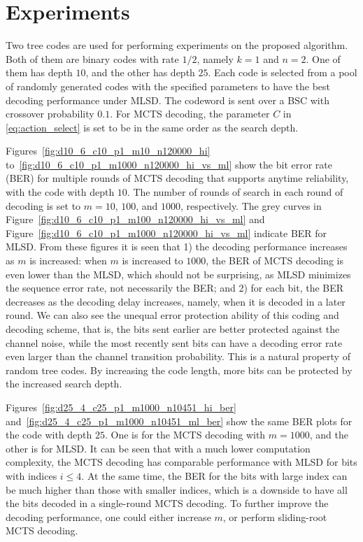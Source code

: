 \documentclass[conference,letterpaper]{IEEEtran}
\begin{document}
\section{Experiments}
Two tree codes are used for performing experiments on the proposed algorithm. Both of them are binary codes with rate $1/2$, namely $k=1$ and $n=2$. One of them has depth $10$, and the other has depth $25$. Each code is selected from a pool of randomly generated codes with the specified parameters to have the best decoding performance under MLSD.
The codeword is sent over a BSC with crossover probability $0.1$. For MCTS decoding, the parameter $C$ in \eqref{eq:action_select} is set to be in the same order as the search depth.

Figures~\ref{fig:d10_6_c10_p1_m10_n120000_hi} to~\ref{fig:d10_6_c10_p1_m1000_n120000_hi_vs_ml} show the bit error rate (BER) for multiple rounds of MCTS decoding that supports anytime reliability, with the code with depth $10$. The number of rounds of search in each round of decoding is set to $m=10$, $100$, and $1000$, respectively. The grey curves in Figure~\ref{fig:d10_6_c10_p1_m100_n120000_hi_vs_ml} and Figure~\ref{fig:d10_6_c10_p1_m1000_n120000_hi_vs_ml} indicate BER for MLSD. From these figures it is seen that 1) the decoding performance increases as $m$ is increased: when $m$ is increased to $1000$, the BER of MCTS decoding is even lower than the MLSD, which should not be surprising, as MLSD minimizes the sequence error rate, not necessarily the BER; and 2) for each bit, the BER decreases as the decoding delay increases, namely, when it is decoded in a later round.
We can also see the unequal error protection ability of this coding and decoding scheme, that is, the bits sent earlier are better protected against the channel noise, while the most recently sent bits can have a decoding error rate even larger than the channel transition probability. This is a natural property of random tree codes. By increasing the code length, more bits can be protected by the increased search depth.

Figures~\ref{fig:d25_4_c25_p1_m1000_n10451_hi_ber} and~\ref{fig:d25_4_c25_p1_m1000_n10451_ml_ber} show the same BER plots for the code with depth $25$. One is for the MCTS decoding with $m=1000$, and the other is for MLSD. 
It can be seen that with a much lower computation complexity, the MCTS decoding has comparable performance with MLSD for bits with indices $i\le 4$. At the same time, the BER for the bits with large index can be much higher than those with smaller indices, which is a downside to have all the bits decoded in a single-round MCTS decoding. To further improve the decoding performance, one could either increase $m$, or perform sliding-root MCTS decoding.
\end{document}
